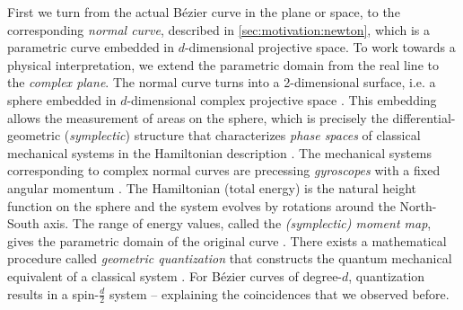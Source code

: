 \documentclass[12pt,final,3p]{elsarticle}
\begin{document}
First we turn from the actual B\'{e}zier curve in the plane or space, to the corresponding \emph{normal curve}, described in \autoref{sec:motivation:newton}, which is a parametric curve embedded in $d$-dimensional projective space. To work towards a physical interpretation, we extend the parametric domain from the real line to the \emph{complex plane}. The normal curve turns into a 2-dimensional surface, i.e. a sphere embedded in $d$-dimensional complex projective space \cite[Ch. 6.3]{bengtsson2006geometry}. This embedding allows the measurement of areas on the sphere, which is precisely the differential-geometric (\emph{symplectic}) structure that characterizes \emph{phase spaces} of classical mechanical systems in the Hamiltonian description \cite{arnold1989mathematical,hand1998analytical,guillemin1984symplectic}. The mechanical systems corresponding to complex normal curves are precessing \emph{gyroscopes} with a fixed angular momentum \cite[Sec. 3]{stone1989supersymmetry}. The Hamiltonian (total energy) is the natural height function on the sphere and the system evolves by rotations around the North-South axis. The range of energy values, called the \emph{(symplectic) moment map}, gives the parametric domain of the original curve \cite{sottile2003toric,da2003symplectic}. There exists a mathematical procedure called \emph{geometric quantization} that constructs the quantum mechanical equivalent of a classical system \cite{blau1992symplectic,todorov2012quantization,woodhouse1997geometric,hall2013quantum}. For B\'{e}zier curves of degree-$d$, quantization results in a spin-$\frac{d}{2}$ system \cite{nlab2016geometric} -- explaining the coincidences that we observed before. 
\end{document}
